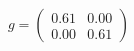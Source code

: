 \documentclass[preview]{standalone}
\begin{document}
\begin{align*}
g = \begin{pmatrix} 0.61 & 0.00 \\ 0.00 & 0.61 \end{pmatrix}
\end{align*}
\end{document}
